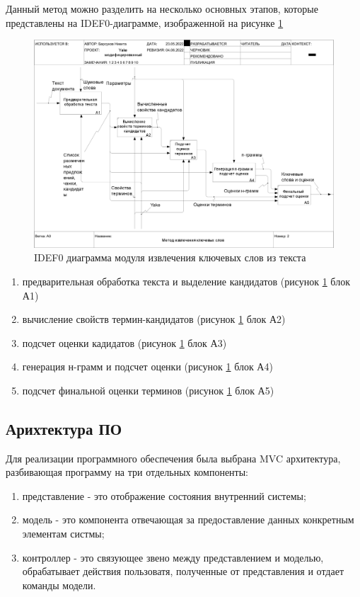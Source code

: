 Данный метод можно разделить на несколько основных этапов, которые представлены на IDEF0-диаграмме, изображенной на рисунке \ref{fig:02a0}
\begin{figure}[!h]
	\centering
	\includegraphics[width=1\linewidth]{src/img/idef0/Yake/02_A0}
	\caption{IDEF0 диаграмма модуля извлечения ключевых слов из текста}
	\label{fig:02a0}
\end{figure}

\begin{enumerate}
	\item предварительная обработка текста и выделение кандидатов (рисунок \ref{fig:02a0} блок А1)
	\item вычисление свойств термин-кандидатов (рисунок \ref{fig:02a0} блок А2)
	\item подсчет оценки кадидатов (рисунок \ref{fig:02a0} блок А3)
	\item генерация н-грамм и подсчет оценки (рисунок \ref{fig:02a0} блок А4)
	\item подсчет финальной оценки терминов (рисунок \ref{fig:02a0} блок А5)
\end{enumerate}

\subsection{Арихтектура ПО}
Для реализации программного обеспечения была выбрана MVC архитектура, разбивающая программу на три отдельных компоненты:
\begin{enumerate}
	\item представление - это отображение состояния внутренний системы;
	\item модель - это компонента отвечающая за предоставление данных конкретным элементам систмы;
	\item контроллер - это связующее звено между представлением и моделью, обрабатывает действия пользоватя, полученные от представления и отдает команды модели.
\end{enumerate}

